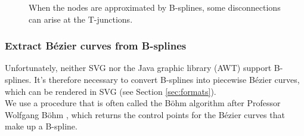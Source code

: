 \documentclass[]{usiinfbachelorproject}
\begin{document}
\begin{figure}[ht]
	\centering
	\caption{When the nodes are approximated by B-splines, some disconnections can arise at the T-junctions.}
	\label{fig:adjustjunction}
\end{figure}

\subsubsection{Extract B\'ezier curves from B-splines} \label{sec:extractbezier}

Unfortunately, neither SVG nor the Java graphic library (AWT) support B-splines. It's therefore necessary to convert B-splines into piecewise B\'ezier curves, which can be rendered in SVG (see Section \ref{sec:formats}).\\
We use a procedure that is often called the B\"ohm algorithm after Professor Wolfgang B\"ohm \cite{Boehm1983}, which returns the control points for the B\'ezier curves that make up a B-spline. \\
\end{document}
